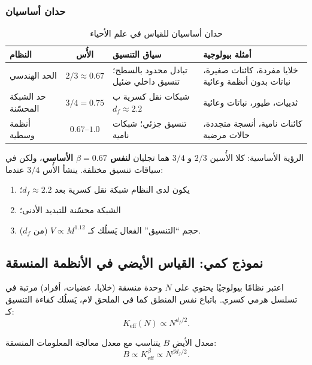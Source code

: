 \documentclass[11pt,a4paper]{article}
\newcommand{\Keff}{K_{\mathrm{eff}}}
\begin{document}
	\subsubsection{حدان أساسيان}
	
	\begin{table}[htbp]
		\centering
		\caption{حدان أساسيان للقياس في علم الأحياء}
		\label{tab:scaling-limits}
		\begin{tabular}{p{3.5cm}c p{6cm} p{5cm}}
			\toprule
			\textbf{النظام} & \textbf{الأُس} & \textbf{سياق التنسيق} & \textbf{أمثلة بيولوجية} \\
			\midrule
			الحد الهندسي & \(2/3 \approx 0.67\) & تبادل محدود بالسطح؛ تنسيق داخلي ضئيل & خلايا مفردة، كائنات صغيرة، نباتات بدون أنظمة وعائية \cite{Glazier2005,Reich2006} \\
			حد الشبكة المحسّنة & \(3/4 = 0.75\) & شبكات نقل كسرية ب \(d_f \approx 2.2\) & ثدييات، طيور، نباتات وعائية \cite{West1997} \\
			أنظمة وسطية & \(0.67\)–\(1.0\) & تنسيق جزئي؛ شبكات نامية & كائنات نامية، أنسجة متجددة، حالات مرضية \cite{Glazier2005} \\
			\bottomrule
		\end{tabular}
	\end{table}
	
	الرؤية الأساسية: كلا الأُسين \(2/3\) و \(3/4\) هما تجليان \textbf{لنفس \(\beta = 0.67\) الأساسي}، ولكن في سياقات تنسيق مختلفة. ينشأ الأُس \(3/4\) عندما:
	\begin{enumerate}
		\item يكون لدى النظام شبكة نقل كسرية بعد \(d_f \approx 2.2\)؛
		\item الشبكة محسّنة للتبديد الأدنى؛
		\item حجم ``التنسيق'' الفعال يَسلُك كـ \(V \propto M^{1.12}\) (من \(d_f\)).
	\end{enumerate}
	
	\subsection{نموذج كمي: القياس الأيضي في الأنظمة المنسقة}
	
	اعتبر نظامًا بيولوجيًا يحتوي على \(N\) وحدة منسقة (خلايا، عضيات، أفراد) مرتبة في تسلسل هرمي كسري. باتباع نفس المنطق كما في الملحق لام، يَسلُك كفاءة التنسيق كـ:
	\begin{equation}
		\Keff(N) \propto N^{d_f/2}.
	\end{equation}
	
	معدل الأيض \(B\) يتناسب مع معدل معالجة المعلومات المنسقة:
	\begin{equation}
		B \propto \Keff^{\beta} \propto N^{\beta d_f/2}.
	\end{equation}
	
\end{document}
